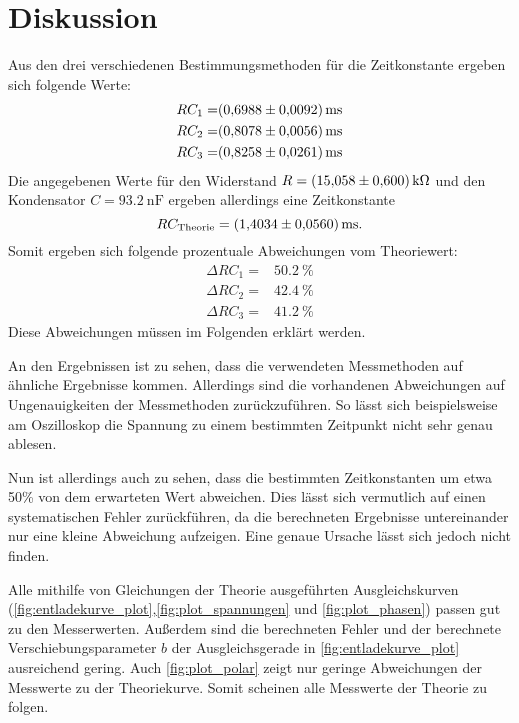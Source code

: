 \section{Diskussion}
\label{sec:Diskussion}


Aus den drei verschiedenen Bestimmungsmethoden für die Zeitkonstante ergeben sich folgende Werte:
\begin{align}
    RC_1 =& \SI{0.6988+-0.0092}{\milli\second} \\
    RC_2 =& \SI{0.8078+-0.0056}{\milli\second} \\
    RC_3 =& \SI{0.8258+-0.0261}{\milli\second}
\end{align}
Die angegebenen Werte für den Widerstand $R=\SI{15.058+-0.6}{\kilo\ohm}$ und den Kondensator $C=\SI{93.2}{\nano\farad}$ ergeben allerdings eine Zeitkonstante
\begin{equation}
    RC_\text{Theorie} = \SI{1.4034+-0.056}{\milli\second}.
\end{equation}
Somit ergeben sich folgende prozentuale Abweichungen vom Theoriewert:
\begin{align}
    \Delta RC_1 =& \SI{50.2}{\percent} \\
    \Delta RC_2 =& \SI{42.4}{\percent} \\
    \Delta RC_3 =& \SI{41.2}{\percent} 
\end{align} 
Diese Abweichungen müssen im Folgenden erklärt werden.

An den Ergebnissen ist zu sehen, dass die verwendeten Messmethoden auf ähnliche Ergebnisse kommen.
Allerdings sind die vorhandenen Abweichungen auf Ungenauigkeiten der Messmethoden zurückzuführen. So lässt sich beispielsweise am Oszilloskop die Spannung zu einem bestimmten Zeitpunkt nicht sehr genau ablesen. 

Nun ist allerdings auch zu sehen, dass die bestimmten Zeitkonstanten um etwa 50\% von dem erwarteten Wert abweichen. Dies lässt sich vermutlich auf einen systematischen Fehler zurückführen, da die berechneten Ergebnisse untereinander nur eine kleine Abweichung aufzeigen. Eine genaue Ursache lässt sich jedoch nicht finden.

Alle mithilfe von Gleichungen der Theorie ausgeführten Ausgleichskurven (\autoref{fig:entladekurve_plot},\autoref{fig:plot_spannungen} und \autoref{fig:plot_phasen}) passen gut zu den Messerwerten. 
Außerdem sind die berechneten Fehler und der berechnete Verschiebungsparameter $b$ der Ausgleichsgerade in \autoref{fig:entladekurve_plot} ausreichend gering. 
Auch \autoref{fig:plot_polar} zeigt nur geringe Abweichungen der Messwerte zu der Theoriekurve. 
Somit scheinen alle Messwerte der Theorie zu folgen.

